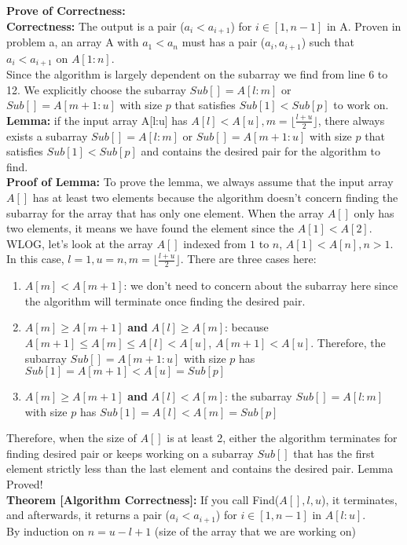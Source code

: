 \documentclass{article}
\begin{document}
\textbf{Prove of Correctness:}
\\\textbf{Correctness:} The output is a pair ($a_i<a_{i+1}$) for $i\in [1,n-1]$ in A. Proven in problem a, an array A with $a_1 < a_n$ must has a pair ($a_i,a_{i+1}$) such that $a_i<a_{i+1}$ on $A[1:n]$.
\\Since the algorithm is largely dependent on the subarray we find from line 6 to 12. We explicitly choose the subarray $Sub[] = A[l:m]$ or $Sub[]=A[m+1:u]$ with size $p$ that satisfies $Sub[1] < Sub[p]$ to work on.
\\\textbf{Lemma:} if the input array A[l:u] has $A[l] < A[u], m=\lfloor \frac{l+u}{2}\rfloor$, there always exists a subarray  $Sub[] = A[l:m]$ or $Sub[]=A[m+1:u]$ with size $p$ that satisfies $Sub[1] < Sub[p]$ and contains the desired pair for the algorithm to find.
\\\textbf{Proof of Lemma:} To prove the lemma, we always assume that the input array $A[]$ has at least two elements because the algorithm doesn't concern finding the subarray for the array that has only one element. When the array $A[]$ only has two elements, it means we have found the element since the $A[1]<A[2]$. WLOG, let's look at the array $A[]$ indexed from $1$ to $n$, $A[1] < A[n], n>1$. In this case, $l = 1, u = n, m=\lfloor \frac{l+u}{2}\rfloor$. There are three cases here:
\begin{enumerate}
    \item $A[m] < A[m+1]$: we don't need to concern about the subarray here since the algorithm will terminate once finding the desired pair.
    \item $A[m] \geq A[m+1]$ \textbf{and} $A[l] \geq A[m]$: because $A[m+1] \leq A[m] \leq A[l] < A[u]$, $A[m+1] < A[u]$. Therefore, the subarray $Sub[] = A[m+1:u]$ with size $p$ has $Sub[1] = A[m+1] < A[u] = Sub[p]$
    \item $A[m] \geq A[m+1]$ \textbf{and} $A[l] < A[m]$: the subarray $Sub[]=A[l:m]$ with size $p$ has $Sub[1] = A[l] < A[m] = Sub[p]$
\end{enumerate}
Therefore, when the size of $A[]$ is at least 2, either the algorithm terminates for finding desired pair or keeps working on a subarray $Sub[]$ that has the first element strictly less than the last element and contains the desired pair. Lemma Proved!
\\\textbf{Theorem [Algorithm Correctness]:} If you call Find($A[ ], l, u$), it terminates, and afterwards, it returns a pair ($a_i<a_{i+1}$) for $i\in [1,n-1]$ in $A[l:u]$.
\\By induction on $n = u-l+1$ (size of the array that we are working on)
\end{document}

